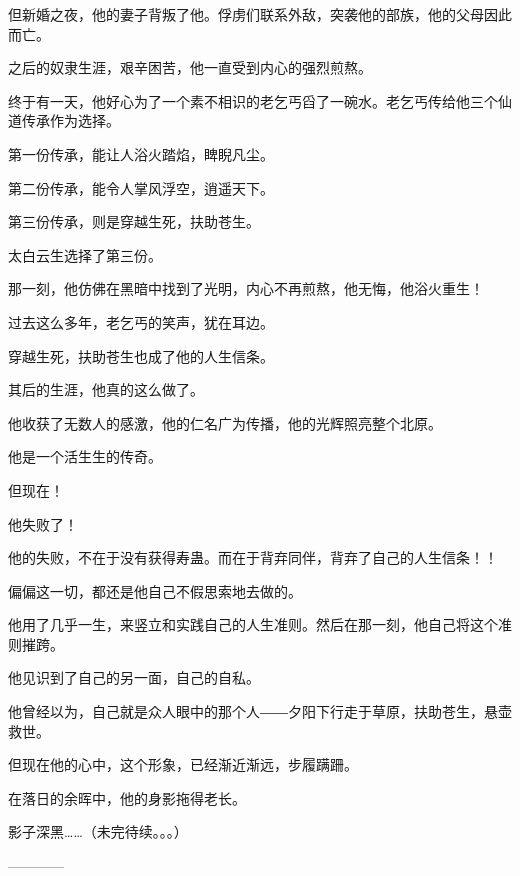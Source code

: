 \begin{this_body}
但新婚之夜，他的妻子背叛了他。俘虏们联系外敌，突袭他的部族，他的父母因此而亡。

之后的奴隶生涯，艰辛困苦，他一直受到内心的强烈煎熬。

终于有一天，他好心为了一个素不相识的老乞丐舀了一碗水。老乞丐传给他三个仙道传承作为选择。

第一份传承，能让人浴火踏焰，睥睨凡尘。

第二份传承，能令人掌风浮空，逍遥天下。

第三份传承，则是穿越生死，扶助苍生。

太白云生选择了第三份。

那一刻，他仿佛在黑暗中找到了光明，内心不再煎熬，他无悔，他浴火重生！

过去这么多年，老乞丐的笑声，犹在耳边。

穿越生死，扶助苍生也成了他的人生信条。

其后的生涯，他真的这么做了。

他收获了无数人的感激，他的仁名广为传播，他的光辉照亮整个北原。

他是一个活生生的传奇。

但现在！

他失败了！

他的失败，不在于没有获得寿蛊。而在于背弃同伴，背弃了自己的人生信条！！

偏偏这一切，都还是他自己不假思索地去做的。

他用了几乎一生，来竖立和实践自己的人生准则。然后在那一刻，他自己将这个准则摧跨。

他见识到了自己的另一面，自己的自私。

他曾经以为，自己就是众人眼中的那个人――夕阳下行走于草原，扶助苍生，悬壶救世。

但现在他的心中，这个形象，已经渐近渐远，步履蹒跚。

在落日的余晖中，他的身影拖得老长。

影子深黑……（未完待续。。。）

------------

\end{this_body}


